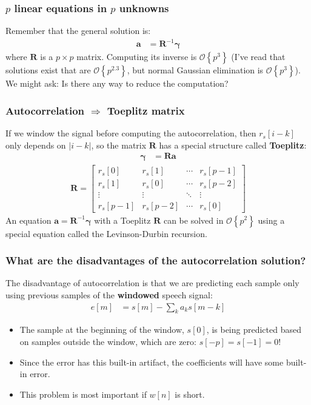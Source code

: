 \documentclass{beamer}
\begin{document}
\begin{frame}
  \frametitle{$p$ linear equations in $p$ unknowns}

  Remember that the general solution is:
  \begin{align*}
    \mathbf{a} &=\mathbf{R}^{-1}\boldsymbol{\gamma}
  \end{align*}
  where $\mathbf{R}$ is a $p\times p$ matrix.  Computing its inverse
  is $\mathcal{O}\left\{p^3\right\}$ (I've read that solutions exist
  that are $\mathcal{O}\left\{p^{2.3}\right\}$, but normal Gaussian
  elimination is $\mathcal{O}\left\{p^3\right\}$).  We might ask: Is
  there any way to reduce the computation?
\end{frame}
  
\begin{frame}
  \frametitle{Autocorrelation $\Rightarrow$ Toeplitz matrix}

  If we window the signal before computing the autocorrelation, then
  $r_s[i-k]$ only depends on $|i-k|$, so the matrix $\mathbf{R}$ has a
  special structure called \textbf{Toeplitz}:
  \begin{align*}
    \boldsymbol{\gamma} &= \mathbf{R}\mathbf{a}
  \end{align*}
  \begin{align*}
    \mathbf{R}=\left[\begin{array}{cccc}
        r_s[0]&r_s[1]&\cdots&r_s[p-1]\\
        r_s[1]&r_s[0]&\cdots&r_s[p-2]\\
        \vdots&\vdots&\ddots&\vdots\\
        r_s[p-1]&r_s[p-2]&\cdots&r_s[0]\end{array}\right]
  \end{align*}
  An equation $\mathbf{a}=\mathbf{R}^{-1}\boldsymbol{\gamma}$ with a Toeplitz
  $\mathbf{R}$ can be solved in $\mathcal{O}\left\{p^2\right\}$ using
  a special equation called the Levinson-Durbin recursion.  
\end{frame}

\begin{frame}
  \frametitle{What are the disadvantages of the autocorrelation solution?}

  The disadvantage of autocorrelation is that we are predicting each
  sample only using previous samples of the \textbf{windowed} speech
  signal:
  \begin{align*}
    e[m] &= s[m]-\sum_k a_ks[m-k]
  \end{align*}
  \begin{itemize}
  \item The sample at the beginning of the window, $s[0]$, is being
    predicted based on samples outside the window, which are zero: $s[-p]=s[-1]=0$!
  \item Since the error has this built-in artifact, the coefficients
    will have some built-in error.
  \item This problem is most important if $w[n]$ is short.
  \end{itemize}
\end{frame}
\end{document}

